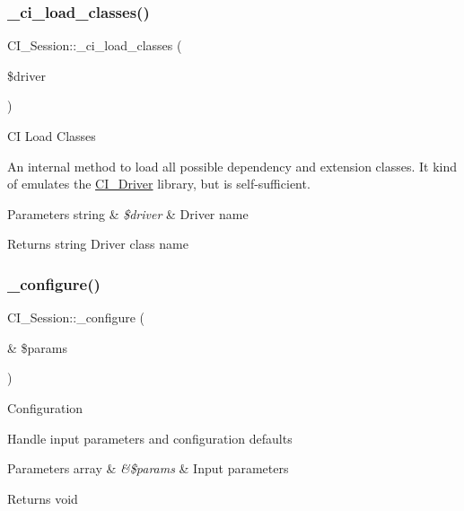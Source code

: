 \subsubsection{\texorpdfstring{\+\_\+ci\+\_\+load\+\_\+classes()}{\_ci\_load\_classes()}}
{\footnotesize\ttfamily C\+I\+\_\+\+Session\+::\+\_\+ci\+\_\+load\+\_\+classes (\begin{DoxyParamCaption}\item[{}]{\$driver }\end{DoxyParamCaption})\hspace{0.3cm}{\ttfamily [protected]}}

CI Load Classes

An internal method to load all possible dependency and extension classes. It kind of emulates the \mbox{\hyperlink{class_c_i___driver}{C\+I\+\_\+\+Driver}} library, but is self-\/sufficient.


\begin{DoxyParams}[1]{Parameters}
string & {\em \$driver} & Driver name \\
\hline
\end{DoxyParams}
\begin{DoxyReturn}{Returns}
string Driver class name 
\end{DoxyReturn}
\mbox{\label{class_c_i___session_a3739e1190b67221d74bbc34790f383fb}} 
\subsubsection{\texorpdfstring{\+\_\+configure()}{\_configure()}}
{\footnotesize\ttfamily C\+I\+\_\+\+Session\+::\+\_\+configure (\begin{DoxyParamCaption}\item[{\&}]{\$params }\end{DoxyParamCaption})\hspace{0.3cm}{\ttfamily [protected]}}

Configuration

Handle input parameters and configuration defaults


\begin{DoxyParams}[1]{Parameters}
array & {\em \&\$params} & Input parameters \\
\hline
\end{DoxyParams}
\begin{DoxyReturn}{Returns}
void 
\end{DoxyReturn}
\mbox{\label{class_c_i___session_a3552a6e7f4722e2ab20fe2923cb89e9f}} 
